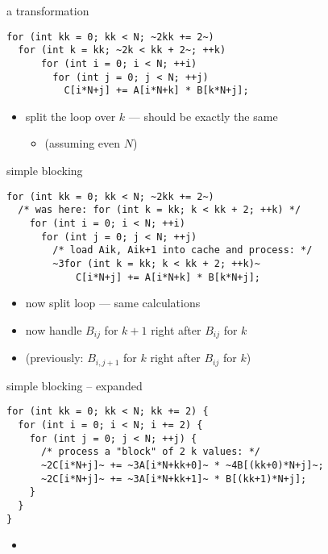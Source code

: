 \begin{frame}[fragile,label=cacheBlockKPrep]{a transformation}
\begin{lstlisting}
for (int kk = 0; kk < N; ~2kk += 2~)
  for (int k = kk; ~2k < kk + 2~; ++k)
      for (int i = 0; i < N; ++i)
        for (int j = 0; j < N; ++j)
          C[i*N+j] += A[i*N+k] * B[k*N+j];
\end{lstlisting}
\begin{itemize}
\item split the loop over $k$ --- should be exactly the same 
    \begin{itemize}
    \item (assuming even $N$)
    \end{itemize}
\end{itemize}
\end{frame}

\begin{frame}[fragile,label=cacheBlockK]{simple blocking}
\begin{lstlisting}
for (int kk = 0; kk < N; ~2kk += 2~)
  /* was here: for (int k = kk; k < kk + 2; ++k) */
    for (int i = 0; i < N; ++i)
      for (int j = 0; j < N; ++j)
        /* load Aik, Aik+1 into cache and process: */
        ~3for (int k = kk; k < kk + 2; ++k)~
            C[i*N+j] += A[i*N+k] * B[k*N+j];
\end{lstlisting}
\begin{itemize}
\item now  split loop --- same calculations
\item<2-> now handle $B_{ij}$ for $k+1$ right after $B_{ij}$ for $k$
\item<2-> (previously: $B_{i,j+1}$ for $k$ right after $B_{ij}$ for $k$)
\end{itemize}
\end{frame}

\begin{frame}[fragile,label=cacheBlockKExpand]{simple blocking -- expanded}
\begin{lstlisting}
for (int kk = 0; kk < N; kk += 2) {
  for (int i = 0; i < N; i += 2) {
    for (int j = 0; j < N; ++j) {
      /* process a "block" of 2 k values: */
      ~2C[i*N+j]~ += ~3A[i*N+kk+0]~ * ~4B[(kk+0)*N+j]~;
      ~2C[i*N+j]~ += ~3A[i*N+kk+1]~ * B[(kk+1)*N+j];
    }
  }
}
\end{lstlisting}
\begin{itemize}
\item {}
\end{itemize}
\end{frame}

